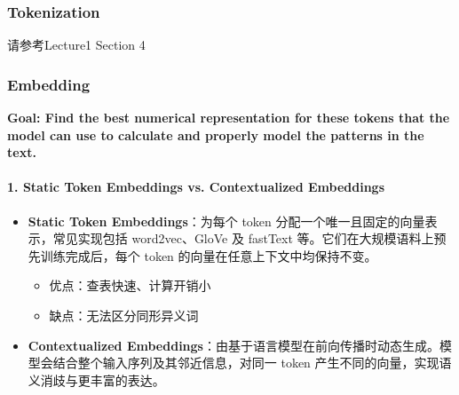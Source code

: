 \subsubsection{Tokenization} 
请参考Lecture1 Section 4
\subsubsection{Embedding}

\textbf{{\color{tred} Goal: Find the best numerical representation for these tokens that the model can use to calculate and properly model the patterns in the text.}}


\paragraph{1. Static Token Embeddings vs. Contextualized Embeddings}
\begin{itemize}
    \item \textbf{Static Token Embeddings}：为每个 token 分配一个唯一且固定的向量表示，常见实现包括 word2vec、GloVe 及 fastText 等。它们在大规模语料上预先训练完成后，每个 token 的向量在任意上下文中均保持不变。
    \begin{itemize}
        \item 优点：查表快速、计算开销小
        \item 缺点：无法区分同形异义词
    \end{itemize}
    \item \textbf{Contextualized Embeddings}：由基于语言模型在前向传播时动态生成。模型会结合整个输入序列及其邻近信息，对同一 token 产生不同的向量，实现语义消歧与更丰富的表达。
\end{itemize}

